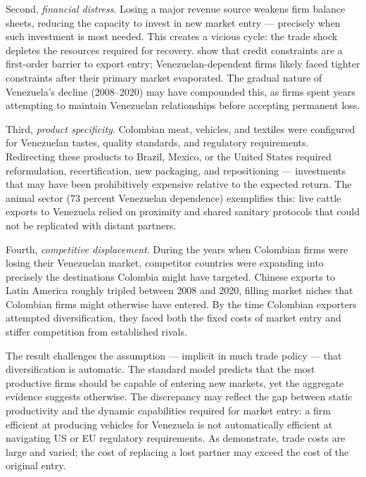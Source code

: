 \documentclass[12pt]{article}
\begin{document}
Second, \emph{financial distress}. Losing a major revenue source weakens firm balance sheets, reducing the capacity to invest in new market entry --- precisely when such investment is most needed. This creates a vicious cycle: the trade shock depletes the resources required for recovery. \citet{manova2013credit} show that credit constraints are a first-order barrier to export entry; Venezuelan-dependent firms likely faced tighter constraints after their primary market evaporated. The gradual nature of Venezuela's decline (2008--2020) may have compounded this, as firms spent years attempting to maintain Venezuelan relationships before accepting permanent loss.

Third, \emph{product specificity}. Colombian meat, vehicles, and textiles were configured for Venezuelan tastes, quality standards, and regulatory requirements. Redirecting these products to Brazil, Mexico, or the United States required reformulation, recertification, new packaging, and repositioning --- investments that may have been prohibitively expensive relative to the expected return. The animal sector (73 percent Venezuelan dependence) exemplifies this: live cattle exports to Venezuela relied on proximity and shared sanitary protocols that could not be replicated with distant partners.

Fourth, \emph{competitive displacement}. During the years when Colombian firms were losing their Venezuelan market, competitor countries were expanding into precisely the destinations Colombia might have targeted. Chinese exports to Latin America roughly tripled between 2008 and 2020, filling market niches that Colombian firms might otherwise have entered. By the time Colombian exporters attempted diversification, they faced both the fixed costs of market entry and stiffer competition from established rivals.

The result challenges the assumption --- implicit in much trade policy --- that diversification is automatic. The standard \citet{melitz2003impact} model predicts that the most productive firms should be capable of entering new markets, yet the aggregate evidence suggests otherwise. The discrepancy may reflect the gap between static productivity and the dynamic capabilities required for market entry: a firm efficient at producing vehicles for Venezuela is not automatically efficient at navigating US or EU regulatory requirements. As \citet{arkolakis2012new} demonstrate, trade costs are large and varied; the cost of replacing a lost partner may exceed the cost of the original entry.
\end{document}
